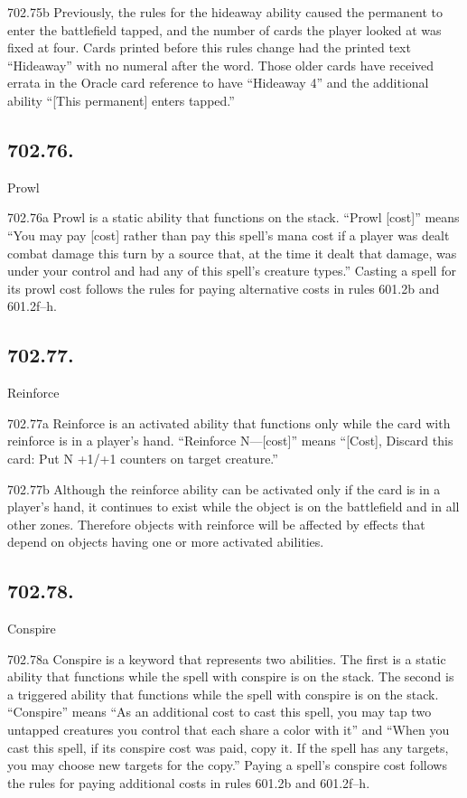 702.75b Previously, the rules for the hideaway ability caused the permanent to enter the battlefield tapped, and the number of cards the player looked at was fixed at four. Cards printed before this rules change had the printed text “Hideaway” with no numeral after the word. Those older cards have received errata in the Oracle card reference to have “Hideaway 4” and the additional ability “[This permanent] enters tapped.”

\subsection*{702.76.}
Prowl

702.76a Prowl is a static ability that functions on the stack. “Prowl [cost]” means “You may pay [cost] rather than pay this spell’s mana cost if a player was dealt combat damage this turn by a source that, at the time it dealt that damage, was under your control and had any of this spell’s creature types.” Casting a spell for its prowl cost follows the rules for paying alternative costs in rules 601.2b and 601.2f–h.

\subsection*{702.77.}
Reinforce

702.77a Reinforce is an activated ability that functions only while the card with reinforce is in a player’s hand. “Reinforce N—[cost]” means “[Cost], Discard this card: Put N +1/+1 counters on target creature.”

702.77b Although the reinforce ability can be activated only if the card is in a player’s hand, it continues to exist while the object is on the battlefield and in all other zones. Therefore objects with reinforce will be affected by effects that depend on objects having one or more activated abilities.

\subsection*{702.78.}
Conspire

702.78a Conspire is a keyword that represents two abilities. The first is a static ability that functions while the spell with conspire is on the stack. The second is a triggered ability that functions while the spell with conspire is on the stack. “Conspire” means “As an additional cost to cast this spell, you may tap two untapped creatures you control that each share a color with it” and “When you cast this spell, if its conspire cost was paid, copy it. If the spell has any targets, you may choose new targets for the copy.” Paying a spell’s conspire cost follows the rules for paying additional costs in rules 601.2b and 601.2f–h.

